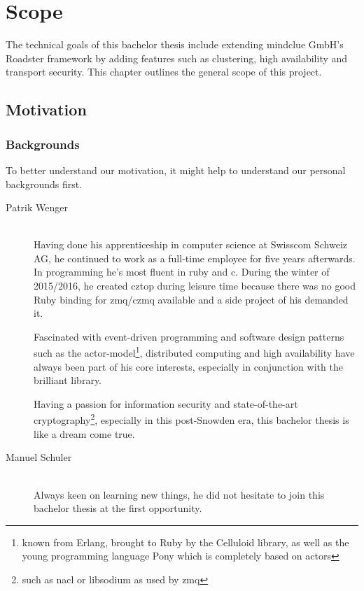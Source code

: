 \chapter{Scope}
The technical goals of this bachelor thesis include extending mindclue GmbH's
Roadster framework by adding features such as clustering, high availability and
transport security. This chapter outlines the general scope of this project.

\section{Motivation}

\subsection*{Backgrounds}
To better understand our motivation, it might help to understand our personal backgrounds first.

\begin{description}
	\item [Patrik Wenger]\hfill\\
		Having done his apprenticeship in computer science at Swisscom
		Schweiz AG, he continued to work as a full-time employee for
		five years afterwards. In programming he's most fluent in
		\gls{ruby} and \gls{c}. During the winter of 2015/2016, he
		created \gls{cztop} during leisure time because there was no
		good Ruby binding for \gls{zmq}/\gls{czmq} available and a side
		project of his demanded it.

		Fascinated with event-driven programming and software design
		patterns such as the \gls{actor-model}\footnote{known from
		Erlang, brought to Ruby by the Celluloid library, as well as the young
		programming language Pony which is completely based on actors},
		distributed computing and high availability have always been
		part of his core interests, especially in conjunction with the
		brilliant \zmq library.

		Having a passion for information security and state-of-the-art
		cryptography\footnote{such as \gls{nacl} or \gls{libsodium} as
		used by \gls{zmq}}, especially in this post-Snowden era, this
		bachelor thesis is like a dream come true.

	\item [Manuel Schuler]\hfill\\
		Always keen on learning new things, he did not hesitate to join
		this bachelor thesis at the first opportunity.
\end{description}

